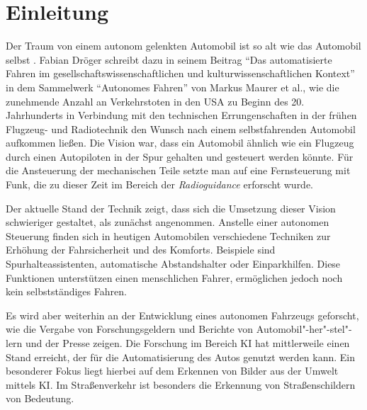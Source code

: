\chapter{Einleitung}
\label{cha:Einleitung}
\setlength{\epigraphwidth}{4in}

Der Traum von einem autonom gelenkten Automobil ist so alt wie das Automobil selbst \cite{maurer_autonomes_2015}. Fabian Dröger schreibt dazu in seinem Beitrag "`Das automatisierte Fahren im gesellschaftswissenschaftlichen und kulturwissenschaftlichen Kontext"' in dem Sammelwerk "`Autonomes Fahren"' von Markus Maurer et al., wie die zunehmende Anzahl an Verkehrstoten in den USA zu Beginn des 20. Jahrhunderts in Verbindung mit den technischen Errungenschaften in der frühen Flugzeug- und Radiotechnik den Wunsch nach einem selbstfahrenden Automobil aufkommen ließen. Die Vision war, dass ein Automobil ähnlich wie ein Flugzeug durch einen Autopiloten in der Spur gehalten und gesteuert werden könnte. Für die Ansteuerung der mechanischen Teile setzte man auf eine Fernsteuerung mit Funk, die zu dieser Zeit im Bereich der \emph{Radioguidance} erforscht wurde.

Der aktuelle Stand der Technik zeigt, dass sich die Umsetzung dieser Vision schwieriger gestaltet, als zunächst angenommen. Anstelle einer autonomen Steuerung finden sich in heutigen Automobilen verschiedene Techniken zur Erhöhung der Fahrsicherheit und des Komforts. Beispiele sind Spurhalteassistenten, automatische Abstandshalter oder Einparkhilfen. Diese Funktionen unterstützen einen menschlichen Fahrer, ermöglichen jedoch noch kein selbstständiges Fahren.

Es wird aber weiterhin an der Entwicklung eines autonomen Fahrzeugs geforscht, wie die Vergabe von Forschungsgeldern\cite{bmbf-internetredaktion_auto_nodate} und Berichte von Automobil"-her"-stel"-lern\cite{bmw_autonomes_nodate} und der Presse\cite{efler_autonomes_2018} zeigen. Die Forschung im Bereich \ac{KI} hat mittlerweile einen Stand erreicht, der für die Automatisierung des Autos genutzt werden kann. Ein besonderer Fokus liegt hierbei auf dem Erkennen von Bilder aus der Umwelt mittels KI. Im Straßenverkehr ist besonders die Erkennung von Straßenschildern von Bedeutung. 


